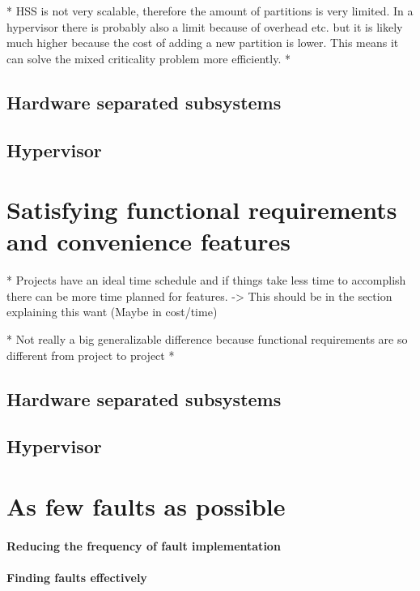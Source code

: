 * HSS is not very scalable, therefore the amount of partitions is very limited. In a hypervisor there is probably also a limit because of overhead etc. but it is likely much higher because the cost of adding a new partition is lower. This means it can solve the mixed criticality problem more efficiently.
* 
\subsection{Hardware separated subsystems}
\subsection{Hypervisor}


\section{Satisfying functional requirements and convenience features}

* Projects have an ideal time schedule and if things take less time to accomplish there can be more time planned for features.
    -> This should be in the section explaining this want (Maybe in cost/time)
    
* Not really a big generalizable difference because functional requirements are so different from project to project
*  
\subsection{Hardware separated subsystems}
\subsection{Hypervisor}


\section{As few faults as possible}
\paragraph{Reducing the frequency of fault implementation}
\paragraph{Finding faults effectively}
